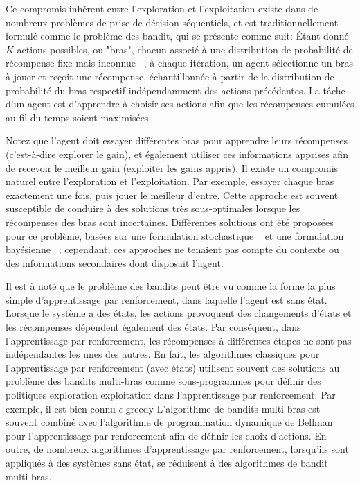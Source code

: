 \documentclass[conference]{IEEEtran}
\newcommand{\1}[1]{\mathbbm{1}_{\left\{#1\right\}}}
\begin{document}
Ce compromis inhérent entre l'exploration et l'exploitation existe dans de nombreux problèmes de prise de décision séquentiels, et est traditionnellement formulé comme le problème des bandit, qui se présente comme suit: Étant donné $K$ actions possibles, ou "bras", chacun associé à une distribution de probabilité de récompense fixe mais inconnue ~\cite{LR85,UCB}, à chaque itération, un agent sélectionne un bras à jouer et reçoit une récompense, échantillonnée à partir de la distribution de probabilité du bras respectif indépendamment des actions précédentes. La tâche d'un agent est d'apprendre à choisir ses actions afin que les récompenses cumulées au fil du temps soient maximisées.

Notez que l'agent doit essayer différentes bras pour apprendre leurs récompenses (c'est-à-dire explorer le gain), et également utiliser ces informations apprises afin de recevoir le meilleur gain (exploiter les gains appris). Il existe un compromis naturel entre l'exploration et l'exploitation. Par exemple, essayer chaque bras exactement une fois, puis jouer le meilleur d'entre. Cette approche est souvent susceptible de conduire à des solutions très sous-optimales lorsque les récompenses des bras sont incertaines. Différentes solutions ont été proposées pour ce problème, basées sur une formulation stochastique ~\cite{LR85,UCB,BouneffoufF16} et une formulation bayésienne ~\cite{AgrawalG12}; cependant, ces approches ne tenaient pas compte du contexte ou des informations secondaires dont disposait l'agent.

Il est à noté que le problème des bandits peut être vu comme la forme la plus simple d'apprentissage par renforcement, dans laquelle l'agent est sans état. Lorsque le système a des états, les actions provoquent des changements d'états et les récompenses dépendent également des états. Par conséquent, dans l'apprentissage par renforcement, les récompenses à différentes étapes ne sont pas indépendantes les unes des autres. En fait, les algorithmes classiques pour l'apprentissage par renforcement (avec états) utilisent souvent des solutions au problème des bandits multi-bras comme sous-programmes pour définir des politiques exploration exploitation dans l'apprentissage par renforcement. Par exemple, il est bien connu $\epsilon$-greedy L'algorithme de bandits multi-bras est souvent combiné avec l'algorithme de programmation dynamique de Bellman pour l'apprentissage par renforcement afin de définir les choix d'actions. En outre, de nombreux algorithmes d'apprentissage par renforcement, lorsqu'ils sont appliqués à des systèmes sans état, se réduisent à des algorithmes de bandit multi-bras.   
\end{document}
